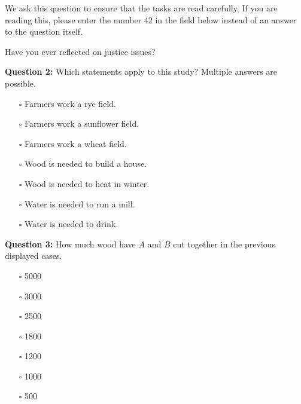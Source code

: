 \documentclass[egregdoesnotlikesansseriftitles]{scrartcl}
\begin{document}
We ask this question to ensure that the tasks are read carefully. %
If you are reading this, please enter the number 42 in the field below instead of an answer to the question itself. %

Have you ever reflected on justice issues?\vspace{1ex} %

\noindent\textbf{Question 2:} Which statements apply to this study? %
Multiple answers are possible. %

\begin{itemize}
   \item[$\square$] Farmers work a rye field. %
   \item[$\square$] Farmers work a sunflower field. %
   \item[$\square$] Farmers work a wheat field. %
   \item[$\square$] Wood is needed to build a house. %
   \item[$\square$] Wood is needed to heat in winter. %
   \item[$\square$] Water is needed to run a mill. %
   \item[$\square$] Water is needed to drink. %
\end{itemize}
\vspace{1ex}

\noindent\textbf{Question 3:} How much wood have $A$ and $B$ cut together in the previous displayed cases. %

\begin{itemize}
   \item[$\square$] 5000
   \item[$\square$] 3000
   \item[$\square$] 2500
   \item[$\square$] 1800
   \item[$\square$] 1200
   \item[$\square$] 1000
   \item[$\square$] 500
\end{itemize}
\end{document}
